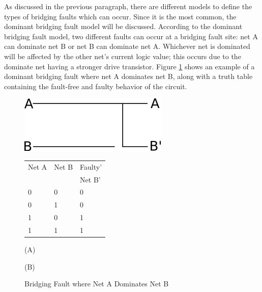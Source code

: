 \documentclass[12pt]{report}
\begin{document}
As discussed in the previous paragraph, there are different models to define the types of bridging faults which can occur.  Since it is the most common, the dominant bridging fault model will be discussed.  According to the dominant bridging fault model, two different faults can occur at a bridging fault site: net A can dominate net B or net B can dominate net A.  Whichever net is dominated will be affected by the other net's current logic value; this occurs due to the dominate net having a stronger drive transistor\cite{stroud-bridging}.  Figure \ref{fig:bridgingfault} shows an example of a dominant bridging fault where net A dominates net B, along with a truth table containing the fault-free and faulty behavior of the circuit.  
\begin{figure}
  \begin{center}
    \begin{minipage}[l]{.55\textwidth}
      \begin{center}
        \includegraphics[scale=.8]{images/bridgingfault}	
      \end{center}
    \end{minipage}
    \begin{minipage}[r]{.35\textwidth}
      \begin{center}
        \begin{tabular}{|l|l|l|}
          \hline
          Net A & Net B & Faulty' \\ 
          & & Net B' \\ \hline
          0 & 0 & 0 \\ \hline
          0 & 1 & 0 \\ \hline
          1 & 0 & 1 \\ \hline
          1 & 1 & 1 \\ \hline
        \end{tabular}
      \end{center}
    \end{minipage}
  \end{center}
  \begin{center}
		\begin{minipage}[l]{.55\textwidth}
      \begin{center}
        (A)
      \end{center}
		\end{minipage}
		\begin{minipage}[r]{.35\textwidth}
      \begin{center}
        (B)
      \end{center}
		\end{minipage}
	\end{center}
  \caption{Bridging Fault where Net A Dominates Net B}
  \label{fig:bridgingfault}
\end{figure}
\end{document}
